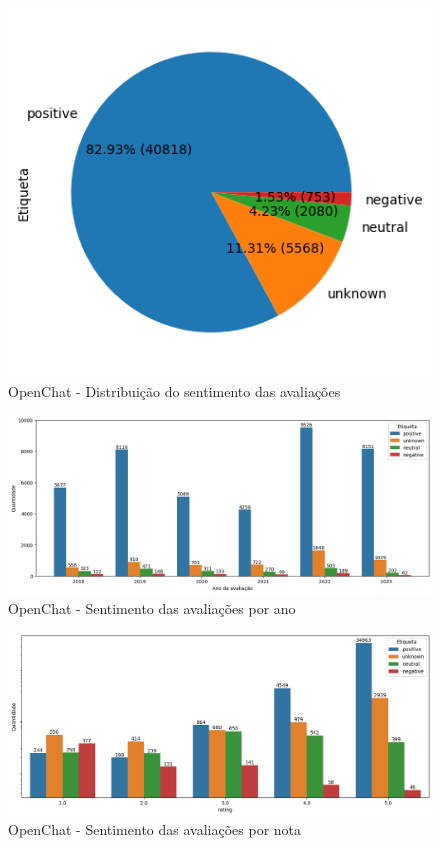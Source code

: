 \begin{figure}
	\centering
	\includegraphics{figs/openchat/distribuicao_pizza.png}
	\caption{OpenChat - Distribuição do sentimento das avaliações}
	\label{img:openchat_pizza_distribuicao}
\end{figure}

\begin{figure}
	\centering
	\includegraphics[width=1\textwidth]{figs/openchat/sentimento_ano.png}
	\caption{OpenChat - Sentimento das avaliações por ano}
	\label{img:openchat_sentimento_ano}
\end{figure}

\begin{figure}
	\centering
	\includegraphics[width=1\textwidth]{figs/openchat/sentimento_nota.png}
	\caption{OpenChat - Sentimento das avaliações por nota}
	\label{img:openchat_sentimento_nota}
\end{figure}

